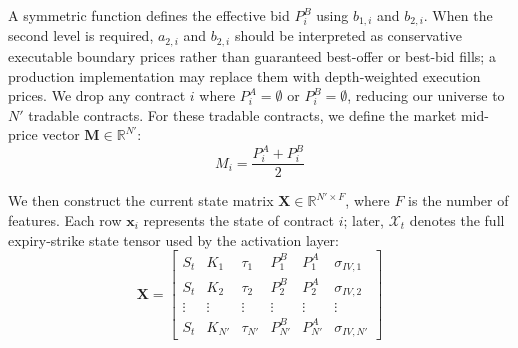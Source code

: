 \documentclass[11pt, a4paper]{article}
\begin{document}
A symmetric function defines the effective bid $P^{B}_i$ using $b_{1,i}$ and $b_{2,i}$. When the second level is required, $a_{2,i}$ and $b_{2,i}$ should be interpreted as conservative executable boundary prices rather than guaranteed best-offer or best-bid fills; a production implementation may replace them with depth-weighted execution prices. We drop any contract $i$ where $P^{A}_i = \emptyset$ or $P^{B}_i = \emptyset$, reducing our universe to $N'$ tradable contracts. For these tradable contracts, we define the market mid-price vector $\mathbf{M} \in \mathbb{R}^{N'}$:
\begin{equation}
M_i = \frac{P^{A}_i + P^{B}_i}{2}
\end{equation}

We then construct the current state matrix $\mathbf{X} \in \mathbb{R}^{N' \times F}$, where $F$ is the number of features. Each row $\mathbf{x}_i$ represents the state of contract $i$; later, $\mathcal{X}_t$ denotes the full expiry-strike state tensor used by the activation layer:
\begin{equation}
\mathbf{X} = \begin{bmatrix}
S_t & K_1 & \tau_1 & P^{B}_1 & P^{A}_1 & \sigma_{IV,1} \\
S_t & K_2 & \tau_2 & P^{B}_2 & P^{A}_2 & \sigma_{IV,2} \\
\vdots & \vdots & \vdots & \vdots & \vdots & \vdots \\
S_t & K_{N'} & \tau_{N'} & P^{B}_{N'} & P^{A}_{N'} & \sigma_{IV,N'}
\end{bmatrix}
\end{equation}
\end{document}
